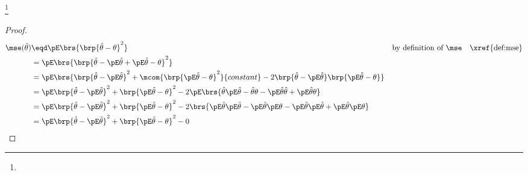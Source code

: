 \begin{theorem}
\label{thm:mse}
\footnote{
  }
\end{theorem}
\begin{proof}
\begin{align*}
  \mse(\hat{\theta}) 
    &\eqd \pE\brs{\brp{\hat{\theta}-\theta}^2}
    && \text{by definition of $\mse$}
    && \text{\xref{def:mse}}
  \\&= \pE\brs{\brp{\hat{\theta}-\pE\hat{\theta}+\pE\hat{\theta}-\theta}^2}
  \\&= \pE\brs{
         \brp{\hat{\theta}-\pE\hat{\theta}}^2
        +\mcom{\brp{\pE\hat{\theta}-\theta}^2}{constant}
        -2\brp{\hat{\theta}-\pE\hat{\theta}}\brp{\pE\hat{\theta}-\theta}
       }
  \\&= \pE\brp{\hat{\theta}-\pE\hat{\theta}}^2
        +\brp{\pE\hat{\theta}-\theta}^2
        -2\pE\brs{
         \hat{\theta}\pE\hat{\theta}
        -\hat{\theta}\theta
        -\pE\hat{\theta}\hat{\theta}
        +\pE\hat{\theta}\theta
        }
  \\&= \pE\brp{\hat{\theta}-\pE\hat{\theta}}^2
        +\brp{\pE\hat{\theta}-\theta}^2
        -2\brs{
         \pE\hat{\theta}\pE\hat{\theta}
        -\pE\hat{\theta}\pE\theta
        -\pE\hat{\theta}\pE\hat{\theta}
        +\pE\hat{\theta}\pE\theta
        }
  \\&= \pE\brp{\hat{\theta}-\pE\hat{\theta}}^2
        +\brp{\pE\hat{\theta}-\theta}^2
        -0
\end{align*}
\end{proof}


